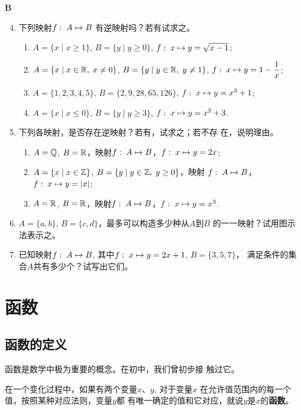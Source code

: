 \begin{center}
    \bfseries B
\end{center}

\begin{enumerate}\setcounter{enumi}{3}
    \item 下列映射$f:\; A\mapsto B$
    有逆映射吗？若有试求之。
\begin{enumerate}[(1)]
    \item $A=\{x\mid x\ge 1\}$, $B=\{y\mid y\ge 0\}$, $f:\; x\mapsto y=\sqrt{x-1}$;
    \item $A=\{x\mid x\in\mathbb{R},\; x\ne 0\}$, $B=\{y\mid y\in\mathbb{R},\; y\ne 1\}$, $f:\; x\mapsto y=1-\dfrac{1}{x}$;
    \item $A=\{1,2,3,4,5\}$, $B=\{2,9,28,65,126\}$, $f:\; x\mapsto y=x^3+1$;
    \item $A=\{x\mid x\le 0\}$, $B=\{y\mid y\ge 3\}$, $f:\; x\mapsto y=x^2+3$.
\end{enumerate}

\item 下列各映射，是否存在逆映射？若有，试求之；若不存
在，说明理由。
\begin{enumerate}[(1)]
    \item $A=\mathbb{Q}$, $B=\mathbb{R}$，映射$f:\; A\mapsto B$，$f:\; x\mapsto y=2x$;
    \item $A=\{x\mid x\in\mathbb{Z}\}$, $B=\{y\mid y\in\mathbb{Z},\; y\ge 0\}$，映射
    $f:\; A\mapsto B$，$f:\; x\mapsto y=|x|$;
\item $A=\mathbb{R}$, $B=\mathbb{R}$，映射$f:\; A\mapsto B$，$f:\; x\mapsto y=x^3$.
\end{enumerate}

\item $A=\{a,b\}$, $B=\{c,d\}$，最多可以构造多少种从$A$到$B$
的一一映射？试用图示法表示之。
\item 已知映射$f:\; A\mapsto B$. 其中$f:\; x\mapsto y=2x+1$, $B=\{3,5,
7\}$，
满足条件的集合$A$共有多少个？试写出它们。

\end{enumerate}

\section{函数}

\subsection{函数的定义}
函数是数学中极为重要的概念。在初中，我们曾初步接
触过它。

在一个变化过程中，如果有两个变量$x$、$y$, 对于变量$x$
在允许值范围内的每一个值，按照某种对应法则，变量$y$都
有唯一确定的值和它对应，就说$y$是$x$的\textbf{函数}。

